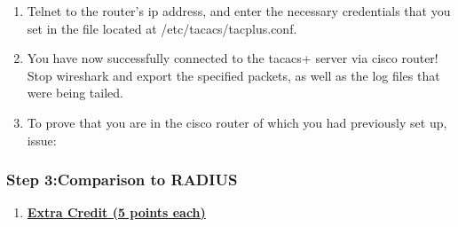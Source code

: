\documentclass[main.tex]{subfiles}
\begin{document}
\begin{enumerate}[noitemsep,label=$\bullet$,leftmargin=20mm,labelsep=0.5cm]
\item Telnet to the router's ip address, and enter the necessary credentials that you set in the file located at /etc/tacacs/tac\textunderscore plus.conf.


\item You have now successfully connected to the tacacs+ server via cisco router! Stop wireshark and export the specified packets, as well as the log files that were being tailed.

\item To prove that you are in the cisco router of which you had previously set up, issue:


\end{enumerate}  

\subsubsection{Step 3:Comparison to RADIUS}
\begin{enumerate}[noitemsep,label=$\bullet$,leftmargin=20mm,labelsep=0.5cm]

\item \textbf{\underline{Extra Credit (5 points each)}}


\end{enumerate}
\end{document}
